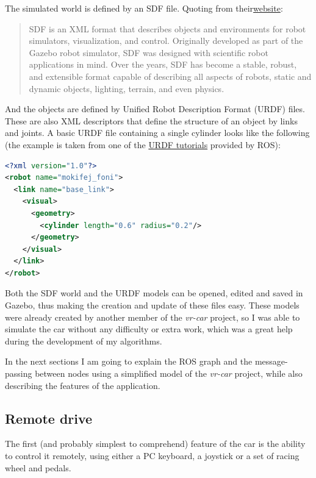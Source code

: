 The simulated world is defined by an SDF file. Quoting from their\href{http://sdformat.org}{website}:

\begin{quote}
SDF is an XML format that describes objects and environments for robot simulators, visualization, and control. Originally developed as part of the Gazebo robot simulator, SDF was designed with scientific robot applications in mind. Over the years, SDF has become a stable, robust, and extensible format capable of describing all aspects of robots, static and dynamic objects, lighting, terrain, and even physics.
\end{quote}

And the objects are defined by Unified Robot Description Format (URDF) files. These are also XML descriptors that define the structure of an object by links and joints. A basic URDF file containing a single cylinder looks like the following (the example is taken from one of the \href{http://wiki.ros.org/urdf/Tutorials}{URDF tutorials} provided by ROS):

\begin{minipage}{\textwidth}
\begin{lstlisting}[language=XML]
<?xml version="1.0"?>
<robot name="mokifej_foni">
  <link name="base_link">
    <visual>
      <geometry>
        <cylinder length="0.6" radius="0.2"/>
      </geometry>
    </visual>
  </link>
</robot>
\end{lstlisting}
\end{minipage}

Both the SDF world and the URDF models can be opened, edited and saved in Gazebo, thus making the creation and update of these files easy. These models were already created by another member of the \textit{vr-car} project, so I was able to simulate the car without any difficulty or extra work, which was a great help during the development of my algorithms.

In the next sections I am going to explain the ROS graph and the message-passing between nodes using a simplified model of the \textit{vr-car} project, while also describing the features of the application.

\subsection{Remote drive}
The first (and probably simplest to comprehend) feature of the car is the ability to control it remotely, using either a PC keyboard, a joystick or a set of racing wheel and pedals.

